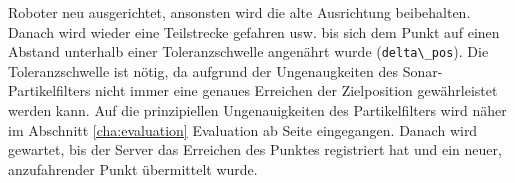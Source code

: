 Roboter neu ausgerichtet, ansonsten wird die alte Ausrichtung beibehalten.
Danach wird wieder eine Teilstrecke gefahren usw. bis sich dem Punkt auf
einen Abstand unterhalb einer Toleranzschwelle angenährt wurde
(\lstinline|delta\_pos|). 
Die Toleranzschwelle ist nötig, da aufgrund der Ungenaugkeiten des
Sonar-Partikelfilters nicht immer eine genaues Erreichen der
Zielposition gewährleistet werden kann.  Auf die prinzipiellen
Ungenauigkeiten des Partikelfilters wird näher im Abschnitt
\ref{cha:evaluation} Evaluation
ab Seite \pageref{cha:evaluation} eingegangen. 
Danach wird gewartet, bis der Server das Erreichen des Punktes registriert
hat und ein neuer, anzufahrender Punkt übermittelt wurde.






